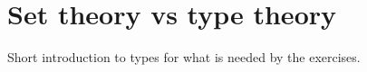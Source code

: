 \section{Set theory vs type theory}
\begin{publictodo}
    Short introduction to types for what is needed by the exercises.
\end{publictodo}

